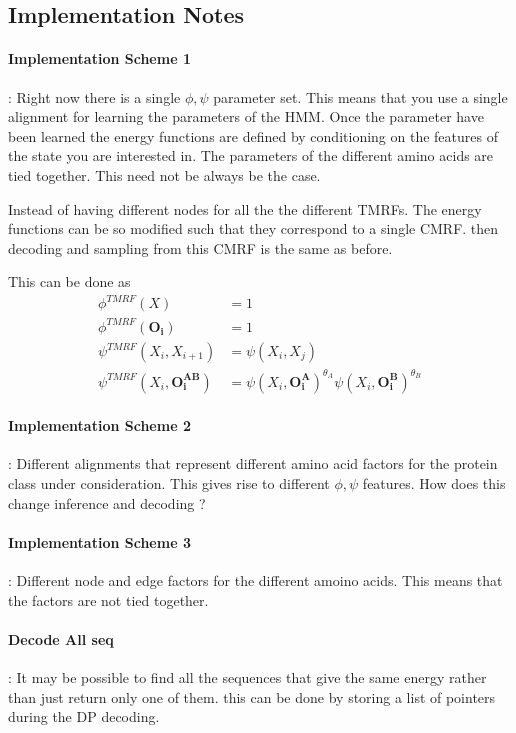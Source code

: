 \documentclass{article}
\begin{document}
\subsection{Implementation Notes}

\paragraph{Implementation Scheme 1} : Right now there is a single $\phi,\psi$ parameter set. This means that you use a single alignment for learning the parameters of the HMM. Once the parameter have been learned the energy functions are defined by conditioning on the features of the state you are interested in. The parameters of the different amino acids are tied together. This need not be always be the case. 

Instead of having different nodes for all the the different TMRFs. The energy functions can be so modified such that they correspond to a single CMRF. then decoding and sampling from this CMRF is the same as before. 

This can be done as 
\begin{align*}
\phi^{TMRF}(X) &= 1 \\
\phi^{TMRF}(\mathbf{O_i}) &= 1 \\
\psi^{TMRF}(X_i,X_{i+1}) &= \psi(X_i,X_j)\\
\psi^{TMRF}(X_i,\mathbf{O_i^{AB}}) &= \psi(X_i,\mathbf{O_i^A})^{\theta_A}\psi(X_i,\mathbf{O_i^B})^{\theta_B}
\end{align*}


\paragraph{Implementation Scheme 2} : Different alignments that represent different amino acid factors for the protein class under consideration. This gives rise to different $\phi,\psi$ features. How does this change inference and decoding ?

\paragraph{Implementation Scheme 3} : Different node and edge factors for the different amoino acids. This means that the factors are not tied together. 

\paragraph{Decode All seq} : It may be possible to find all the sequences that give the same energy rather than just return only one of them. this can be done by storing a list of pointers during the DP decoding.
\end{document}

